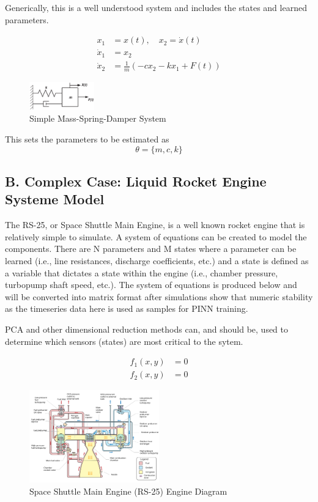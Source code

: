 \documentclass[11pt,letterpaper]{article}
\begin{document}
Generically, this is a well understood system and includes the states and learned parameters.

\begin{equation}
\begin{aligned}
x_1 &= x(t), \quad x_2 = \dot{x}(t) \\
\dot{x}_1 &= x_2 \\
\dot{x}_2 &= \frac{1}{m} \left( -c x_2 - k x_1 + F(t) \right)
\end{aligned}
\end{equation}

\begin{figure}[htbp]
  \centering
  \includegraphics[width=0.25\textwidth]{../../documents/images/mass-spring-damper-system.png}
  \caption{Simple Mass-Spring-Damper System}
  \label{fig:mass-spring-damper-diagram}
\end{figure}

This sets the parameters to be estimated as \\
$$\theta = \{ m, c, k \}$$ 

\subsection*{B. Complex Case: Liquid Rocket Engine Systeme Model}

The RS-25, or Space Shuttle Main Engine, is a well known rocket engine that is relatively simple to simulate. A system of equations can be created to model the components. There are N parameters and M states where a parameter can be learned (i.e., line resistances, discharge coefficients, etc.) and a state is defined as a variable that dictates a state within the engine (i.e., chamber pressure, turbopump shaft speed, etc.). The system of equations is produced below and will be converted into matrix format after simulations show that numeric stability as the timeseries data here is used as samples for PINN training.

PCA and other dimensional reduction methods can, and should be, used to determine which sensors (states) are most critical to the sytem.

\begin{align}
f_1(x, y) &= 0 \\
f_2(x, y) &= 0
\end{align}

\begin{figure}[htbp]
  \centering
  \includegraphics[width=0.5\textwidth]{../../documents/images/SSME_engine_schematic}
  \caption{Space Shuttle Main Engine (RS-25) Engine Diagram}
  \label{fig:SSME_engine_diagram}
\end{figure}
\end{document}
